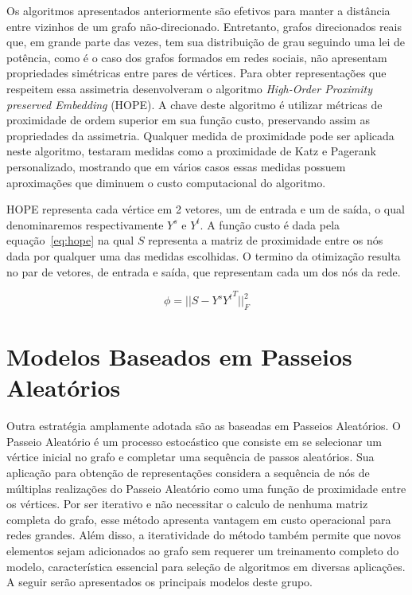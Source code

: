 Os algoritmos apresentados anteriormente são efetivos para manter a distância
entre vizinhos de um grafo não-direcionado.
Entretanto, grafos direcionados reais que, em grande parte das vezes, tem sua
distribuição de grau seguindo uma lei de potência, como é o caso dos grafos
formados em redes sociais, não apresentam propriedades simétricas entre pares de
vértices.
Para obter representações que respeitem essa assimetria \citet{ou16}
desenvolveram o algoritmo \textit{High-Order Proximity preserved Embedding}
(HOPE).
A chave deste algoritmo é utilizar métricas de proximidade de ordem superior em
sua função custo, preservando assim as propriedades da assimetria.
Qualquer medida de proximidade pode ser aplicada neste algoritmo, \citet{ou16}
testaram medidas como a proximidade de Katz e Pagerank personalizado, mostrando
que em vários casos essas medidas possuem aproximações que diminuem o custo
computacional do algoritmo.

HOPE representa cada vértice em 2 vetores, um de entrada e um de saída, o qual
denominaremos respectivamente $Y^s$ e $Y^t$.
A função custo é dada pela equação~\ref{eq:hope} na qual $S$ representa a matriz
de proximidade entre os nós dada por qualquer uma das medidas escolhidas.
O termino da otimização resulta no par de vetores, de entrada e saída, que
representam cada um dos nós da rede.

\begin{equation} \label{eq:hope}
    \phi = \vert\vert S - Y^s {Y^t}^{T} \vert\vert^2_F
\end{equation}

\section{Modelos Baseados em Passeios Aleatórios}

Outra estratégia amplamente adotada são as baseadas em Passeios Aleatórios.
O Passeio Aleatório é um processo estocástico que consiste em se selecionar um
vértice inicial no grafo e completar uma sequência de passos aleatórios.
Sua aplicação para obtenção de representações considera a sequência de nós de
múltiplas realizações do Passeio Aleatório como uma função de proximidade entre
os vértices.
Por ser iterativo e não necessitar o calculo de nenhuma matriz completa do
grafo, esse método apresenta vantagem em custo operacional para redes grandes.
Além disso, a iteratividade do método também permite que novos elementos sejam
adicionados ao grafo sem requerer um treinamento completo do modelo,
característica essencial para seleção de algoritmos em diversas aplicações.
A seguir serão apresentados os principais modelos deste grupo.

